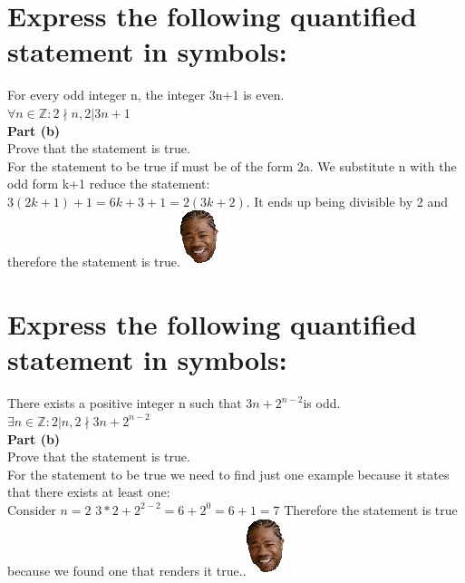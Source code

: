 \section{Express the following quantified statement in symbols:}
For every odd integer n, the integer 3n+1 is even.\\
$\forall n\in \mathbb{Z} : 2\nmid n , 2|3n+1$\\
\textbf{Part (b)} \\
Prove that the statement is true.\\
For the statement to be true if must be of the form 2a. We substitute n with the odd form k+1 reduce the statement:\\
$3(2k+1)+1 = 6k +3 +1 = 2(3k+2)$. It ends up being divisible by 2 and therefore the statement is true.\includegraphics[scale=0.70]{billeder/xzibit}


\section{Express the following quantified statement in symbols:}
There exists a positive integer n such that $3n+2^{n-2}$is odd.\\
$\exists n \in \mathbb{Z} : 2|n, 2\nmid 3n+2^{n-2}$\\
\textbf{Part (b)} \\
Prove that the statement is true.\\
For the statement to be true we need to find just one example because it states that there exists at least one:\\
Consider $n=2$
$3*2+2^{2-2}=6+2^0=6+1=7$ Therefore the statement is true because we found one that renders it true..\includegraphics[scale=0.70]{billeder/xzibit}


